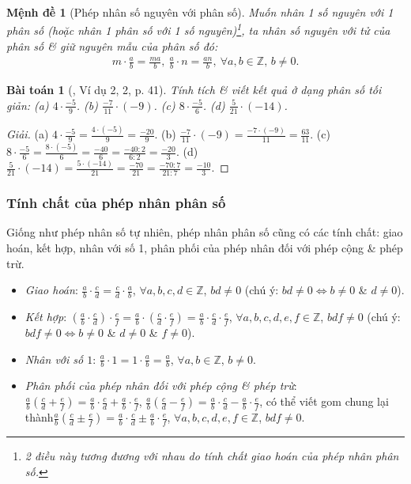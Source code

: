 \documentclass{article}
\newtheorem{baitoan}{Bài toán}
\newtheorem{menhde}{Mệnh đề}
\begin{document}
\begin{menhde}[Phép nhân số nguyên với phân số]
	Muốn nhân 1 số nguyên với 1 phân số (hoặc nhân 1 phân số với 1 số nguyên)\footnote{2 điều này tương đương với nhau do tính chất giao hoán của phép nhân phân số.}, ta nhân số nguyên với tử của phân số \& giữ nguyên mẫu của phân số đó:
	\begin{align*}
		m\cdot\frac{a}{b} = \frac{ma}{b},\ \frac{a}{b}\cdot n = \frac{an}{b},\ \forall a,b\in\mathbb{Z},\,b\ne0.
	\end{align*}
\end{menhde}

\begin{baitoan}[\cite{SGK_Toan_6_Canh_Dieu_tap_2}, Ví dụ 2, 2, p. 41]
	Tính tích \& viết kết quả ở dạng phân số tối giản: (a) $4\cdot\frac{-5}{9}$. (b) $\frac{-7}{11}\cdot(-9)$. (c) $8\cdot\frac{-5}{6}$. (d) $\frac{5}{21}\cdot(-14)$.
\end{baitoan}

\begin{proof}[Giải]
	(a) $4\cdot\frac{-5}{9} = \frac{4\cdot(-5)}{9} = \frac{-20}{9}$. (b) $\frac{-7}{11}\cdot(-9) = \frac{-7\cdot(-9)}{11} = \frac{63}{11}$. (c) $8\cdot\frac{-5}{6} = \frac{8\cdot(-5)}{6} = \frac{-40}{6} = \frac{-40:2}{6:2} = \frac{-20}{3}$. (d) $\frac{5}{21}\cdot(-14) = \frac{5\cdot(-14)}{21} = \frac{-70}{21} = \frac{-70:7}{21:7} = \frac{-10}{3}$.
\end{proof}

\subsubsection{Tính chất của phép nhân phân số}
Giống như phép nhân số tự nhiên, phép nhân phân số cũng có các tính chất: giao hoán, kết hợp, nhân với số 1, phân phối của phép nhân đối với phép cộng \& phép trừ.
\begin{itemize}
	\item \textit{Giao hoán}: $\frac{a}{b}\cdot\frac{c}{d} =  \frac{c}{d}\cdot\frac{a}{b}$, $\forall a,b,c,d\in\mathbb{Z}$, $bd\ne0$ (chú ý: $bd\ne0\Leftrightarrow b\ne0$ \& $d\ne0$).
	\item \textit{Kết hợp}: $\left(\frac{a}{b}\cdot\frac{c}{d}\right)\cdot\frac{e}{f} = \frac{a}{b}\cdot\left(\frac{c}{d}\cdot\frac{e}{f}\right) = \frac{a}{b}\cdot\frac{c}{d}\cdot\frac{e}{f}$, $\forall a,b,c,d,e,f\in\mathbb{Z}$, $bdf\ne0$ (chú ý: $bdf\ne0\Leftrightarrow b\ne0$ \& $d\ne0$ \& $f\ne0$).
	\item \textit{Nhân với số $1$}: $\frac{a}{b}\cdot1 = 1\cdot\frac{a}{b} = \frac{a}{b}$, $\forall a,b\in\mathbb{Z}$, $b\ne0$.
	\item \textit{Phân phối của phép nhân đối với phép cộng \& phép trừ}: $\frac{a}{b}\left(\frac{c}{d} + \frac{e}{f}\right) = \frac{a}{b}\cdot\frac{c}{d} + \frac{a}{b}\cdot\frac{e}{f}$, $\frac{a}{b}\left(\frac{c}{d} - \frac{e}{f}\right) = \frac{a}{b}\cdot\frac{c}{d} - \frac{a}{b}\cdot\frac{e}{f}$, có thể viết gom chung lại thành$\frac{a}{b}\left(\frac{c}{d}\pm\frac{e}{f}\right) = \frac{a}{b}\cdot\frac{c}{d}\pm\frac{a}{b}\cdot\frac{e}{f}$, $\forall a,b,c,d,e,f\in\mathbb{Z}$, $bdf\ne0$.
\end{itemize}
\end{document}
